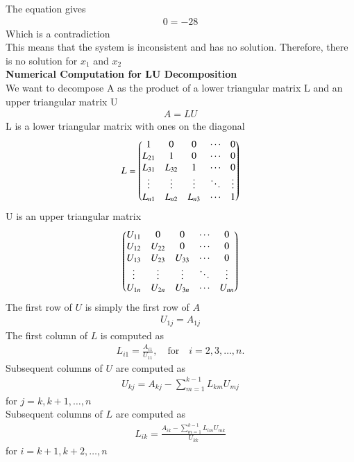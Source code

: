 \documentclass[journal]{IEEEtran}
\begin{document}
The equation gives 
\begin{align}
    0 = -28 
\end{align}
Which is a contradiction \\
This means that the system is inconsistent and has no solution. Therefore, there is no solution for $x_1$ and $x_2$ \\
\textbf{Numerical Computation for LU Decomposition}\\
We want to decompose A as the product of a lower triangular matrix L and an upper triangular matrix U  
\begin{align}
    A = LU
\end{align}
L is a lower triangular matrix with ones on the diagonal
\begin{align}
    L = \begin{pmatrix}1 & 0 & 0 & \cdots & 0 \\
L_{21} & 1 & 0 & \cdots & 0 \\
L_{31} & L_{32} & 1 & \cdots & 0 \\
\vdots & \vdots & \vdots & \ddots & \vdots \\
L_{n1} & L_{n2} & L_{n3} & \cdots & 1\end{pmatrix}
\end{align}
U is an upper triangular matrix
\begin{align}
    \begin{pmatrix}U_{11} & 0 & 0 & \cdots & 0 \\
U_{12} & U_{22} & 0 & \cdots & 0 \\
U_{13} & U_{23} & U_{33} & \cdots & 0 \\
\vdots & \vdots & \vdots & \ddots & \vdots \\
U_{1n} & U_{2n} & U_{3n} & \cdots & U_{nn}\end{pmatrix}
\end{align}
The first row of $U$ is simply the first row of $A$
\begin{align}
    U_{1j} = A_{1j} 
\end{align}
The first column of $L$ is computed as
\begin{align}
    L_{i1} = \frac{A_{i1}}{U_{11}}, \quad \text{for} \quad i = 2, 3, \dots, n.
\end{align}
Subsequent columns of $U$ are computed as 
\begin{align}
    U_{kj} = A_{kj} - \sum_{m=1}^{k-1} L_{km} U_{mj}
\end{align}
for $j = k, k+1, \dots, n$\\
Subsequent columns of $L$ are computed as
\begin{align}
    L_{ik} = \frac{A_{ik} - \sum_{m=1}^{k-1} L_{im} U_{mk}}{U_{kk}}
\end{align}
for $i= k+1, k+2, \dots, n$ \\
\end{document}
